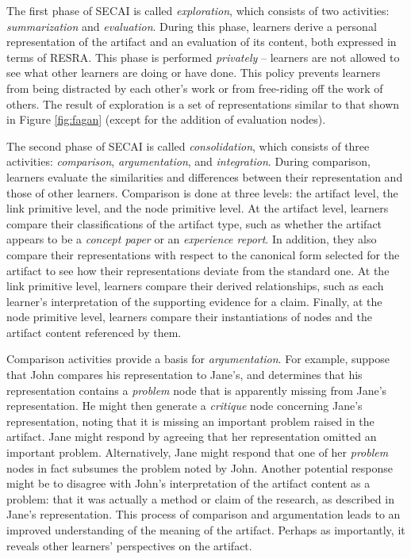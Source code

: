 The first phase of SECAI is called {\it exploration}, which consists of two
activities: {\it summarization\/} and {\it evaluation\/}. During this
phase, learners derive a personal representation of the artifact and an
evaluation of its content, both expressed in terms of RESRA. This phase is
performed {\it privately} -- learners are not allowed to see what other
learners are doing or have done.  This policy prevents learners from being
distracted by each other's work or from free-riding off the work of others.
The result of exploration is a set of representations similar to that shown
in Figure \ref{fig:fagan} (except for the addition of evaluation nodes).

The second phase of SECAI is called {\it consolidation}, which consists of
three activities: {\it comparison}, {\it argumentation}, and {\it
integration}. During comparison, learners evaluate the similarities and
differences between their representation and those of other learners.
Comparison is done at three levels: the artifact level, the link primitive
level, and the node primitive level.  At the artifact level, learners
compare their classifications of the artifact type, such as whether the
artifact appears to be a {\it concept paper\/} or an {\it experience
report\/}. In addition, they also compare their representations with
respect to the canonical form selected for the artifact to see how their
representations deviate from the standard one. At the link primitive level,
learners compare their derived relationships, such as each learner's
interpretation of the supporting evidence for a claim. Finally, at the node
primitive level, learners compare their instantiations of nodes and the
artifact content referenced by them.

Comparison activities provide a basis for {\it argumentation\/}. For
example, suppose that John compares his representation to Jane's, and
determines that his representation contains a {\em problem} node that is
apparently missing from Jane's representation.  He might then generate a
{\em critique} node concerning Jane's representation, noting that it is
missing an important problem raised in the artifact.  Jane might respond by
agreeing that her representation omitted an important problem.
Alternatively, Jane might respond that one of her {\em problem} nodes in
fact subsumes the problem noted by John.  Another potential response might
be to disagree with John's interpretation of the artifact content as a
problem: that it was actually a method or claim of the research, as
described in Jane's representation. This process of comparison and
argumentation leads to an improved understanding of the meaning of the
artifact. Perhaps as importantly, it reveals other learners' perspectives
on the artifact.

